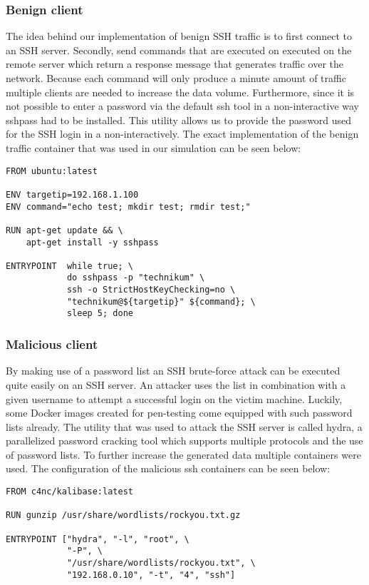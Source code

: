 \documentclass[conference]{IEEEtran}
\begin{document}
\subsubsection{Benign client}
The idea behind our implementation of benign SSH traffic is to first connect to an SSH server. Secondly, send commands that are executed on executed on the remote server which return a response message that generates traffic over the network. Because each command will only produce a minute amount of traffic multiple clients are needed to increase the data volume. Furthermore, since it is not possible to enter a password via the default ssh tool in a non-interactive way sshpass had to be installed. This utility allows us to provide the password used for the SSH login in a non-interactively. The exact implementation of the benign traffic container that was used in our simulation can be seen below:

\begin{lstlisting}[basicstyle=\footnotesize]
FROM ubuntu:latest

ENV targetip=192.168.1.100
ENV command="echo test; mkdir test; rmdir test;"

RUN apt-get update && \ 
    apt-get install -y sshpass
    
ENTRYPOINT  while true; \
            do sshpass -p "technikum" \
            ssh -o StrictHostKeyChecking=no \ 
            "technikum@${targetip}" ${command}; \
            sleep 5; done
\end{lstlisting}

\subsubsection{Malicious client}
By making use of a password list an SSH brute-force attack can be executed quite easily on an SSH server. An attacker uses the list in combination with a given username to attempt a successful login on the victim machine. Luckily, some Docker images created for pen-testing come equipped with such password lists already. The utility that was used to attack the SSH server is called hydra, a parallelized password cracking tool which supports multiple protocols and the use of password lists. To further increase the generated data multiple containers were used.
The configuration of the malicious ssh containers can be seen below:

\begin{lstlisting}[basicstyle=\footnotesize]
FROM c4nc/kalibase:latest

RUN gunzip /usr/share/wordlists/rockyou.txt.gz

ENTRYPOINT ["hydra", "-l", "root", \
            "-P", \
            "/usr/share/wordlists/rockyou.txt", \
            "192.168.0.10", "-t", "4", "ssh"]
\end{lstlisting}
\end{document}
